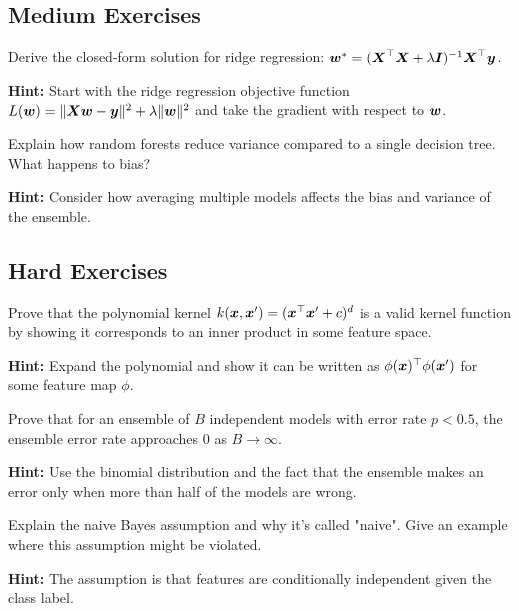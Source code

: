 \subsection*{Medium Exercises}

\begin{problem}
\label{prob:ridge-derivation}
Derive the closed-form solution for ridge regression: $\boldsymbol{w}^* = (\boldsymbol{X}^\top \boldsymbol{X} + \lambda \boldsymbol{I})^{-1} \boldsymbol{X}^\top \boldsymbol{y}$.

\textbf{Hint:} Start with the ridge regression objective function $L(\boldsymbol{w}) = \|\boldsymbol{X}\boldsymbol{w} - \boldsymbol{y}\|^2 + \lambda \|\boldsymbol{w}\|^2$ and take the gradient with respect to $\boldsymbol{w}$.
\end{problem}

\begin{problem}
\label{prob:random-forest-bias-variance}
Explain how random forests reduce variance compared to a single decision tree. What happens to bias?

\textbf{Hint:} Consider how averaging multiple models affects the bias and variance of the ensemble.
\end{problem}

\subsection*{Hard Exercises}

\begin{problem}
\label{prob:svm-kernel-trick}
Prove that the polynomial kernel $k(\boldsymbol{x}, \boldsymbol{x}') = (\boldsymbol{x}^\top \boldsymbol{x}' + c)^d$ is a valid kernel function by showing it corresponds to an inner product in some feature space.

\textbf{Hint:} Expand the polynomial and show it can be written as $\phi(\boldsymbol{x})^\top \phi(\boldsymbol{x}')$ for some feature map $\phi$.
\end{problem}

\begin{problem}
\label{prob:ensemble-theory}
Prove that for an ensemble of $B$ independent models with error rate $p < 0.5$, the ensemble error rate approaches 0 as $B \to \infty$.

\textbf{Hint:} Use the binomial distribution and the fact that the ensemble makes an error only when more than half of the models are wrong.
\end{problem}

\begin{problem}
\label{prob:naive-bayes}
Explain the naive Bayes assumption and why it's called "naive". Give an example where this assumption might be violated.

\textbf{Hint:} The assumption is that features are conditionally independent given the class label.
\end{problem}

